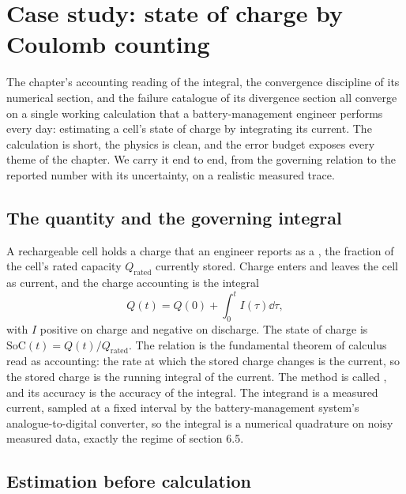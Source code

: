 \section{Case study: state of charge by Coulomb counting}

The chapter's accounting reading of the integral, the convergence
discipline of its numerical section, and the failure catalogue of its
divergence section all converge on a single working calculation that a
battery-management engineer performs every day: estimating a cell's
state of charge by integrating its current. The calculation is short,
the physics is clean, and the error budget exposes every theme of the
chapter. We carry it end to end, from the governing relation to the
reported number with its uncertainty, on a realistic measured trace.

\subsection{The quantity and the governing integral}

A rechargeable cell holds a charge that an engineer reports as a
, the fraction of the cell's rated capacity
$Q_{\mathrm{rated}}$ currently stored. Charge enters and leaves the
cell as current, and the charge accounting is the integral
\[
Q(t) = Q(0) + \int_{0}^{t} I(\tau)\dd\tau,
\]
with $I$ positive on charge and negative on discharge. The state of
charge is $\mathrm{SoC}(t) = Q(t)/Q_{\mathrm{rated}}$. The relation is
the fundamental theorem of calculus read as accounting: the rate at
which the stored charge changes is the current, so the stored charge
is the running integral of the current. The method is called
, and its accuracy is the accuracy of the
integral. The integrand is a measured current, sampled at a fixed
interval by the battery-management system's analogue-to-digital
converter, so the integral is a numerical quadrature on noisy
measured data, exactly the regime of section 6.5.

\subsection{Estimation before calculation}

